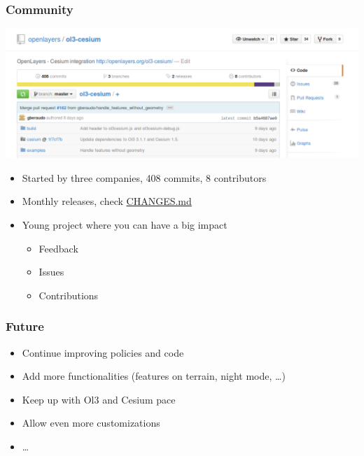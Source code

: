 \documentclass{beamer}
\begin{document}
  
  \begin{frame}
    \frametitle{Community}
    \vspace{-20pt}\begin{center}
      \includegraphics[width=0.9\linewidth]{./github2.png}
    \end{center}
    
    \begin{itemize}
     \item Started by three companies, 408 commits, 8 contributors
     \pause
     \item Monthly releases, check \href{https://github.com/openlayers/ol3-cesium/blob/master/CHANGES.md}{CHANGES.md}
     \pause
     \item Young project where you can have a big impact
     \begin{itemize}
       \item Feedback
       \item Issues
       \item Contributions
     \end{itemize}
    \end{itemize}
  \end{frame}


  \begin{frame}
    \frametitle{Future}
    \begin{itemize}
      \item Continue improving policies and code
      \item Add more functionalities (features on terrain, night mode, \dots)
      \item Keep up with Ol3 and Cesium pace
      \item Allow even more customizations
      \item \dots
    \end{itemize}
  \end{frame}
\end{document}
